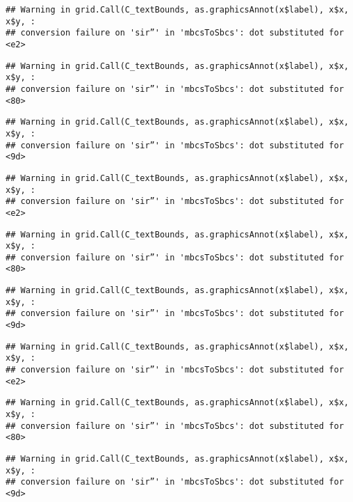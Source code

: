 \documentclass[
]{book}
\begin{document}
\begin{verbatim}
## Warning in grid.Call(C_textBounds, as.graphicsAnnot(x$label), x$x, x$y, :
## conversion failure on 'sir”' in 'mbcsToSbcs': dot substituted for <e2>
\end{verbatim}

\begin{verbatim}
## Warning in grid.Call(C_textBounds, as.graphicsAnnot(x$label), x$x, x$y, :
## conversion failure on 'sir”' in 'mbcsToSbcs': dot substituted for <80>
\end{verbatim}

\begin{verbatim}
## Warning in grid.Call(C_textBounds, as.graphicsAnnot(x$label), x$x, x$y, :
## conversion failure on 'sir”' in 'mbcsToSbcs': dot substituted for <9d>
\end{verbatim}

\begin{verbatim}
## Warning in grid.Call(C_textBounds, as.graphicsAnnot(x$label), x$x, x$y, :
## conversion failure on 'sir”' in 'mbcsToSbcs': dot substituted for <e2>
\end{verbatim}

\begin{verbatim}
## Warning in grid.Call(C_textBounds, as.graphicsAnnot(x$label), x$x, x$y, :
## conversion failure on 'sir”' in 'mbcsToSbcs': dot substituted for <80>
\end{verbatim}

\begin{verbatim}
## Warning in grid.Call(C_textBounds, as.graphicsAnnot(x$label), x$x, x$y, :
## conversion failure on 'sir”' in 'mbcsToSbcs': dot substituted for <9d>
\end{verbatim}

\begin{verbatim}
## Warning in grid.Call(C_textBounds, as.graphicsAnnot(x$label), x$x, x$y, :
## conversion failure on 'sir”' in 'mbcsToSbcs': dot substituted for <e2>
\end{verbatim}

\begin{verbatim}
## Warning in grid.Call(C_textBounds, as.graphicsAnnot(x$label), x$x, x$y, :
## conversion failure on 'sir”' in 'mbcsToSbcs': dot substituted for <80>
\end{verbatim}

\begin{verbatim}
## Warning in grid.Call(C_textBounds, as.graphicsAnnot(x$label), x$x, x$y, :
## conversion failure on 'sir”' in 'mbcsToSbcs': dot substituted for <9d>
\end{verbatim}
\end{document}
